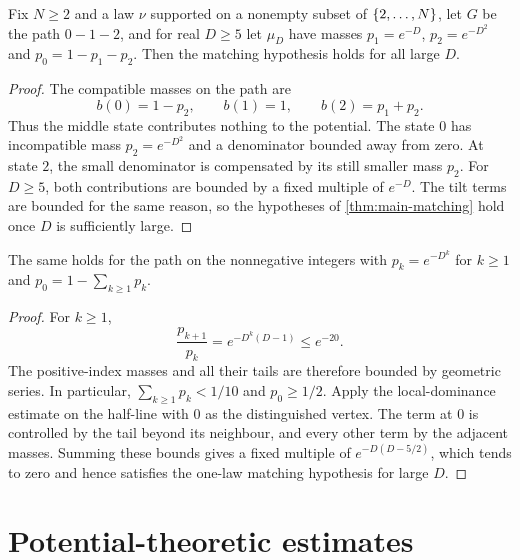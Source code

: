 \begin{corollary}
\label{thm:exponential}
\leanok
Fix $N\geq2$ and a law $\nu$ supported on a nonempty subset of $\{2,\dots,N\}$, let $G$ be the
path $0-1-2$, and for real $D\geq5$ let $\mu_D$ have masses $p_1=e^{-D}$, $p_2=e^{-D^2}$ and
$p_0=1-p_1-p_2$. Then the matching hypothesis holds for all large $D$.
\end{corollary}

\begin{proof}
\leanok
{}
The compatible masses on the path are
\[
 b(0)=1-p_2,\qquad b(1)=1,\qquad b(2)=p_1+p_2.
\]
Thus the middle state contributes nothing to the potential. The state $0$ has incompatible mass
$p_2=e^{-D^2}$ and a denominator bounded away from zero. At state $2$, the small denominator
is compensated by its still smaller mass $p_2$. For $D\geq5$, both contributions are bounded
by a fixed multiple of $e^{-D}$. The tilt terms are bounded for the same reason, so the
hypotheses of \cref{thm:main-matching} hold once $D$ is sufficiently large.
\end{proof}

\begin{corollary}
\label{thm:doubleexp}
\leanok
The same holds for the path on the nonnegative integers with $p_k=e^{-D^k}$ for $k\geq1$ and
$p_0=1-\sum_{k\geq1}p_k$.
\end{corollary}

\begin{proof}
\leanok
{}
For $k\geq1$,
\[
 \frac{p_{k+1}}{p_k}=e^{-D^k(D-1)}\leq e^{-20}.
\]
The positive-index masses and all their tails are therefore bounded by geometric series. In
particular, $\sum_{k\geq1}p_k<1/10$ and $p_0\geq1/2$. Apply the local-dominance estimate on
the half-line with $0$ as the distinguished vertex. The term at $0$ is controlled by the tail
beyond its neighbour, and every other term by the adjacent masses. Summing these bounds gives a
fixed multiple of $e^{-D(D-5/2)}$, which tends to zero and hence satisfies the one-law matching
hypothesis for large $D$.
\end{proof}

\section{Potential-theoretic estimates}

